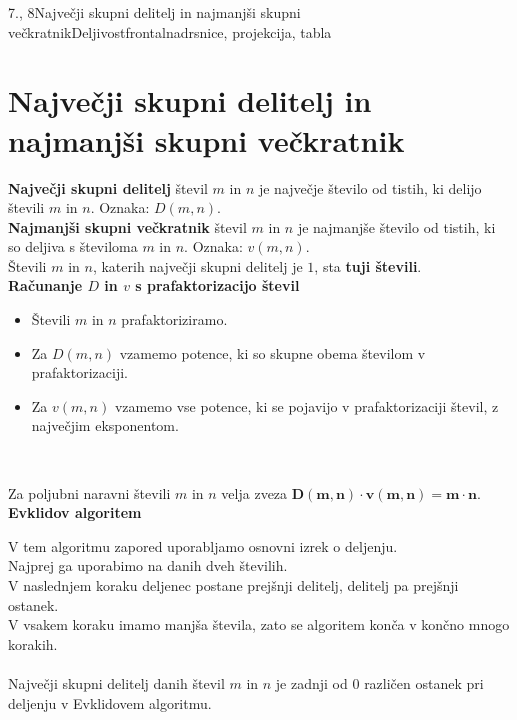 \begin{priprava}{7., 8}{}{Največji skupni delitelj in najmanjši skupni večkratnik}{Deljivost}{frontalna}{drsnice, projekcija, tabla}


    \section{Največji skupni delitelj in najmanjši skupni večkratnik}

        

    \textbf{Največji skupni delitelj} števil $m$ in $n$ je največje število od tistih, ki delijo števili $m$ in $n$. 
    Oznaka: $D(m,n)$.           
    \\

    \textbf{Najmanjši skupni večkratnik} števil $m$ in $n$ je najmanjše število od tistih, ki so deljiva s številoma $m$ in $n$. 
    Oznaka: $v(m,n)$.
    \\


    Števili $m$ in $n$, katerih največji skupni delitelj je $1$, sta \textbf{tuji števili}.
    \\



\textbf{Računanje $D$ in $v$ s prafaktorizacijo števil}
    \begin{itemize}
        \item Števili $m$ in $n$ prafaktoriziramo.
        \item Za $D(m,n)$ vzamemo potence, ki so skupne obema številom v prafaktorizaciji.
        \item Za $v(m,n)$ vzamemo vse potence, ki se pojavijo v prafaktorizaciji števil, z največjim eksponentom.
    \end{itemize}                
~


    Za poljubni naravni števili $m$ in $n$ velja zveza $\mathbf{D(m,n)\cdot v(m,n)=m\cdot n}$.
\\

\textbf{Evklidov algoritem}

    V tem algoritmu zapored uporabljamo osnovni izrek o deljenju. 
    \\ Najprej ga uporabimo na danih dveh številih.
    \\ V naslednjem koraku deljenec postane prejšnji delitelj, delitelj pa prejšnji ostanek. 
    \\ V vsakem koraku imamo manjša števila, zato se algoritem konča v končno mnogo korakih.
    \\ ~\\ Največji skupni delitelj danih števil $m$ in $n$ je zadnji od $0$ različen ostanek pri deljenju v Evklidovem algoritmu.





\end{priprava}
